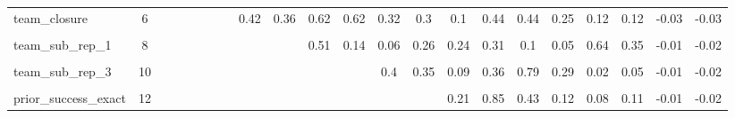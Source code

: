 \begin{table}[!h]
\begin{tabular}[t]{lccccccccccccccccccccc}
\addlinespace
team\_closure & 6 &  &  &  &  &  &  & 0.42 & 0.36 & 0.62 & 0.62 & 0.32 & 0.3 & 0.1 & 0.44 & 0.44 & 0.25 & 0.12 & 0.12 & -0.03 & -0.03\\
\cellcolor{gray!10}{team\_exact\_repetition} & \cellcolor{gray!10}{7} & \cellcolor{gray!10}{} & \cellcolor{gray!10}{} & \cellcolor{gray!10}{} & \cellcolor{gray!10}{} & \cellcolor{gray!10}{} & \cellcolor{gray!10}{} & \cellcolor{gray!10}{} & \cellcolor{gray!10}{0.48} & \cellcolor{gray!10}{0.93} & \cellcolor{gray!10}{0.27} & \cellcolor{gray!10}{0.08} & \cellcolor{gray!10}{0.58} & \cellcolor{gray!10}{0.07} & \cellcolor{gray!10}{0.52} & \cellcolor{gray!10}{0.21} & \cellcolor{gray!10}{0.05} & \cellcolor{gray!10}{0.07} & \cellcolor{gray!10}{0.19} & \cellcolor{gray!10}{-0.03} & \cellcolor{gray!10}{-0.03}\\
team\_sub\_rep\_1 & 8 &  &  &  &  &  &  &  &  & 0.51 & 0.14 & 0.06 & 0.26 & 0.24 & 0.31 & 0.1 & 0.05 & 0.64 & 0.35 & -0.01 & -0.02\\
\cellcolor{gray!10}{team\_sub\_rep\_2} & \cellcolor{gray!10}{9} & \cellcolor{gray!10}{} & \cellcolor{gray!10}{} & \cellcolor{gray!10}{} & \cellcolor{gray!10}{} & \cellcolor{gray!10}{} & \cellcolor{gray!10}{} & \cellcolor{gray!10}{} & \cellcolor{gray!10}{} & \cellcolor{gray!10}{} & \cellcolor{gray!10}{0.35} & \cellcolor{gray!10}{0.14} & \cellcolor{gray!10}{0.55} & \cellcolor{gray!10}{0.09} & \cellcolor{gray!10}{0.6} & \cellcolor{gray!10}{0.27} & \cellcolor{gray!10}{0.1} & \cellcolor{gray!10}{0.09} & \cellcolor{gray!10}{0.2} & \cellcolor{gray!10}{-0.03} & \cellcolor{gray!10}{-0.04}\\
team\_sub\_rep\_3 & 10 &  &  &  &  &  &  &  &  &  &  & 0.4 & 0.35 & 0.09 & 0.36 & 0.79 & 0.29 & 0.02 & 0.05 & -0.01 & -0.02\\
\addlinespace
\cellcolor{gray!10}{team\_sub\_rep\_4} & \cellcolor{gray!10}{11} & \cellcolor{gray!10}{} & \cellcolor{gray!10}{} & \cellcolor{gray!10}{} & \cellcolor{gray!10}{} & \cellcolor{gray!10}{} & \cellcolor{gray!10}{} & \cellcolor{gray!10}{} & \cellcolor{gray!10}{} & \cellcolor{gray!10}{} & \cellcolor{gray!10}{} & \cellcolor{gray!10}{} & \cellcolor{gray!10}{0.09} & \cellcolor{gray!10}{0.03} & \cellcolor{gray!10}{0.12} & \cellcolor{gray!10}{0.25} & \cellcolor{gray!10}{0.67} & \cellcolor{gray!10}{0.03} & \cellcolor{gray!10}{0.03} & \cellcolor{gray!10}{-0.01} & \cellcolor{gray!10}{-0.01}\\
prior\_success\_exact & 12 &  &  &  &  &  &  &  &  &  &  &  &  & 0.21 & 0.85 & 0.43 & 0.12 & 0.08 & 0.11 & -0.01 & -0.02\\

\end{tabular}
\end{table}
